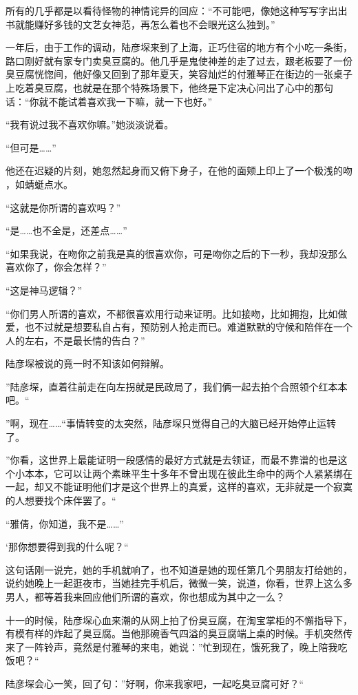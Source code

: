 \documentclass[11pt,a4paper]{article}
\begin{document}
所有的几乎都是以看待怪物的神情诧异的回应：“不可能吧，像她这种写写字出出书就能赚好多钱的文艺女神范，再怎么着也不会眼光这么独到。”﻿﻿﻿

一年后，由于工作的调动，陆彦堔来到了上海，正巧住宿的地方有个小吃一条街，路口刚好就有家专门卖臭豆腐的。他几乎是鬼使神差的走了过去，跟老板要了一份臭豆腐恍惚间，他好像又回到了那年夏天，笑容灿烂的付雅琴正在街边的一张桌子上吃着臭豆腐，也就是在那个特殊场景下，他终是下定决心问出了心中的那句话：“你就不能试着喜欢我一下嘛，就一下也好。”﻿﻿

“我有说过我不喜欢你嘛。”她淡淡说着。﻿﻿

“但可是……”﻿﻿

他还在迟疑的片刻，她忽然起身而又俯下身子，在他的面颊上印上了一个极浅的吻 ，如蜻蜓点水。﻿﻿

“这就是你所谓的喜欢吗？”﻿﻿

“是……也不全是，还差点……”﻿﻿

“如果我说，在吻你之前我是真的很喜欢你，可是吻你之后的下一秒，我却没那么喜欢你了，你会怎样？”﻿﻿

“这是神马逻辑？”﻿﻿

“你们男人所谓的喜欢，不都很喜欢用行动来证明。比如接吻，比如拥抱，比如做爱，也不过就是想要私自占有，预防别人抢走而已。难道默默的守候和陪伴在一个人的左右，不是最长情的告白？”﻿﻿

陆彦堔被说的竟一时不知该如何辩解。﻿﻿

”陆彦堔，直着往前走在向左拐就是民政局了，我们俩一起去拍个合照领个红本本吧。“﻿﻿

”啊，现在……“事情转变的太突然，陆彦堔只觉得自己的大脑已经开始停止运转了。﻿﻿

”你看，这世界上最能证明一段感情的最好方式就是去领证，而最不靠谱的也是这个小本本，它可以让两个素昧平生十多年不曾出现在彼此生命中的两个人紧紧绑在一起，却又不能证明他们才是这个世界上的真爱，这样的喜欢，无非就是一个寂寞的人想要找个床伴罢了。“﻿﻿

“雅倩，你知道，我不是……”﻿﻿

‘那你想要得到我的什么呢？“﻿﻿

这句话刚一说完，她的手机就响了，也不知道是她的现任第几个男朋友打给她的，说约她晚上一起逛夜市，当她挂完手机后，微微一笑，说道，你看，世界上这么多男人，都等着我来回应他们所谓的喜欢，你也想成为其中之一么？﻿﻿

十一的时候，陆彦堔心血来潮的从网上拍了份臭豆腐，在淘宝掌柜的不懈指导下，有模有样的炸起了臭豆腐。当他那碗香气四溢的臭豆腐端上桌的时候。手机突然传来了一阵铃声，竟然是付雅琴的来电，她说：”忙到现在，饿死我了，晚上陪我吃饭吧？“﻿﻿

陆彦堔会心一笑，回了句：”好啊，你来我家吧，一起吃臭豆腐可好？“﻿
\end{document}
